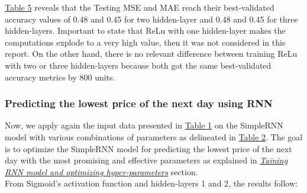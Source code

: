 \hyperref[table:Results for RNN, ReLu, High]{Table 5} reveals that the Testing MSE and MAE reach their best-validated accuracy values of 0.48 and 0.45 for two hidden-layer and 0.48 and 0.45 for three hidden-layers. Important to state that ReLu with one hidden-layer makes the computations explode to a very high value, then it was not considered in this report. On the other hand, there is no relevant difference between training ReLu with two or three hidden-layers because both got the same best-validated accuracy metrics by 800 units.\\

\subsubsection{Predicting the lowest price of the next day using RNN}
\label{chap:Predicting the lowest price of the next day using RNN}

\quad Now, we apply again the input data presented in \hyperref[table:TrainingFeatures]{Table 1} on the SimpleRNN model with various combinations of parameters as delineated in \hyperref[table:Hyper-parameters for SimpleRNN]{Table 2}. The goal is to optimize the SimpleRNN model for predicting the lowest price of the next day with the most promising and effective parameters as explained in \hyperref[chap:Training RNN model and optimizing hyper-parameters]{\textit{Taining RNN model and optimizing hyper-parameters}} section.\\

From Sigmoid's activation function and hidden-layers 1 and 2, the results follow:

